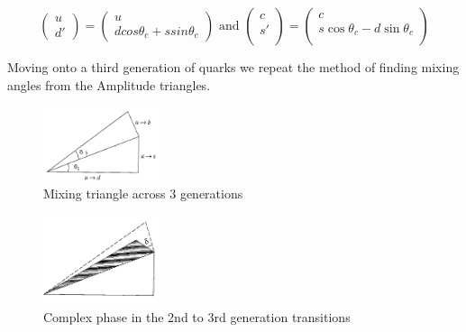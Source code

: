 \documentclass[floatfix,aps,prd,amsmath,amssymb]{revtex4}
\begin{document}
\[\left( \begin{array}{c}
 u \\ d'
 \end{array} \right)  = 
\left( \begin{array}{c}
 u \\ dcos\theta_c +ssin\theta_c
 \end{array} \right) \mbox{ and }
 \left( \begin{array}{c}
 c \\ s' \\
 \end{array} \right)  =
 \left( \begin{array}
{c} c \\
 s\cos\theta_c -d \sin\theta_c \\
 \end{array}
\right)
\]

Moving onto a third generation of quarks we repeat the method of finding mixing angles from the Amplitude triangles.

\begin{figure}[h]
\includegraphics[width=0.3\textwidth]{figs/ckmfig4a.jpg}
\caption{Mixing triangle across 3 generations}
\label{tri3}
\end{figure}
\begin{figure}[h]
\includegraphics[width=0.3\textwidth]{figs/ckmfig4b.jpg}
\caption{Complex phase in the 2nd to 3rd generation transitions}
\label{tri4}
\end{figure}
\end{document}
